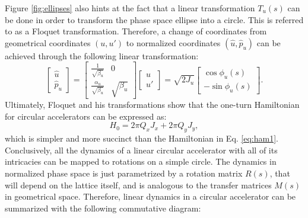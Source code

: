 Figure \ref{fig:ellipses} also hints at the fact that a linear transformation $T_u(s)$ can be done in order to transform the phase space ellipse into a circle. This is referred to as a Floquet transformation. Therefore, a change of coordinates from geometrical coordinates $(u,u')$ to normalized coordinates $(\hat{u},\hat{p}_u)$ can be achieved through the following linear transformation:
\begin{equation}
    \label{eq:floquet}
    \begin{bmatrix} 
        \hat{u} \\
        \hat{p}_u     
    \end{bmatrix}
    =
    \begin{bmatrix} 
        \frac{1}{\sqrt{\beta_u}} & 0 \\ 
        \frac{\alpha_u}{\sqrt{\beta_u}} & \sqrt{\beta_u}
    \end{bmatrix}
    \begin{bmatrix} 
        u \\
        u'     
    \end{bmatrix}
    =
    \sqrt{2J_u}
    \begin{bmatrix} 
        \cos \phi _u (s) \\
        -\sin \phi _u (s)    
    \end{bmatrix}.
\end{equation}
Ultimately, Floquet and his transformations show that the one-turn Hamiltonian for circular accelerators can be expressed as:
\begin{equation}
    \label{eq:hflo}
    H_0=2\pi Q_x J_x + 2\pi Q_y J_y,
\end{equation}
which is simpler and more succinct than the Hamiltonian in Eq. \ref{eq:ham1}. Conclusively, all the dynamics of a linear circular accelerator with all of its intricacies can be mapped to rotations on a simple circle. The dynamics in normalized phase space is just parametrized by a rotation matrix $R(s)$, that will depend on the lattice itself, and is analogous to the transfer matrices $M(s)$ in geometrical space. Therefore, linear dynamics in a circular accelerator can be summarized with the following commutative diagram:      
